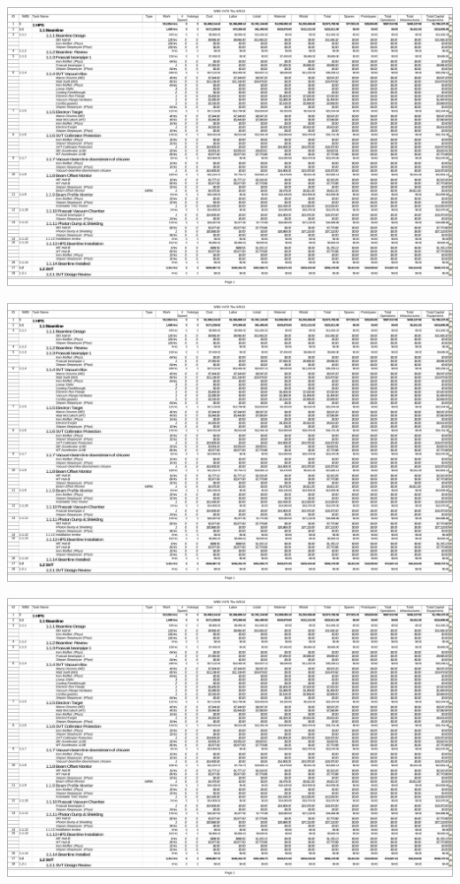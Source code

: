 \begin{center}
\includegraphics[page=3,angle=90,height=\textheight]{cost_schedule/HPSV470.pdf} 
\end{center}

\begin{center}
\includegraphics[page=4,angle=90,height=\textheight]{cost_schedule/HPSV470.pdf} 
\end{center}

\begin{center}
\includegraphics[page=5,angle=90,height=\textheight]{cost_schedule/HPSV470.pdf} 
\end{center}

